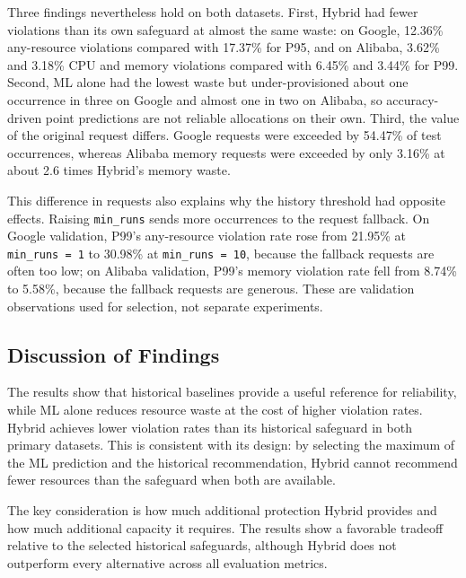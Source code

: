 Three findings nevertheless hold on both datasets. First, Hybrid had fewer violations than its own safeguard at almost the same waste: on Google, 12.36\% any-resource violations compared with 17.37\% for P95, and on Alibaba, 3.62\% and 3.18\% CPU and memory violations compared with 6.45\% and 3.44\% for P99. Second, ML alone had the lowest waste but under-provisioned about one occurrence in three on Google and almost one in two on Alibaba, so accuracy-driven point predictions are not reliable allocations on their own. Third, the value of the original request differs. Google requests were exceeded by 54.47\% of test occurrences, whereas Alibaba memory requests were exceeded by only 3.16\% at about 2.6 times Hybrid's memory waste.

This difference in requests also explains why the history threshold had opposite effects. Raising \texttt{min\_runs} sends more occurrences to the request fallback. On Google validation, P99's any-resource violation rate rose from 21.95\% at \texttt{min\_runs\ =\ 1} to 30.98\% at \texttt{min\_runs\ =\ 10}, because the fallback requests are often too low; on Alibaba validation, P99's memory violation rate fell from 8.74\% to 5.58\%, because the fallback requests are generous. These are validation observations used for selection, not separate experiments.

\subsection{Discussion of Findings}\label{sec:7.5}

The results show that historical baselines provide a useful reference for reliability, while ML alone reduces resource waste at the cost of higher violation rates. Hybrid achieves lower violation rates than its historical safeguard in both primary datasets. This is consistent with its design: by selecting the maximum of the ML prediction and the historical recommendation, Hybrid cannot recommend fewer resources than the safeguard when both are available.

The key consideration is how much additional protection Hybrid provides and how much additional capacity it requires. The results show a favorable tradeoff relative to the selected historical safeguards, although Hybrid does not outperform every alternative across all evaluation metrics.

